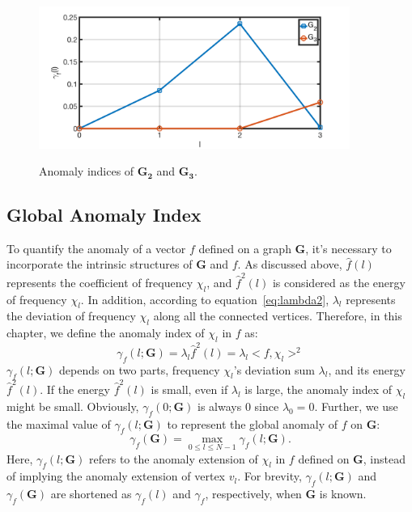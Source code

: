 \begin{figure}[t]
	\centering
    {
		\includegraphics[width= 4in] {figures/new_graph.png}
		\label{fig:distribution2}
	}
	\caption{Anomaly indices of $\mathbf{G_2}$ and $\mathbf{G_3}$.}
	\label{fig:new_graph}
\end{figure}

\subsection{Global Anomaly Index}
\label{sec:signal_anomaly_on_Graph}

To quantify the anomaly of a vector $f$ defined on a graph $\mathbf{G}$, it's necessary to incorporate the intrinsic structures of $\mathbf{G}$ and $f$. As discussed above, $\hat{f}(l)$ represents the coefficient of frequency $\chi_l$, and $\hat{f}^2(l)$ is considered as the energy of frequency $\chi_l$. In addition, according to equation~\ref{eq:lambda2}, $\lambda_l$ represents the deviation of frequency $\chi_l$ along all the connected vertices. Therefore, in this chapter, we define the anomaly index of $\chi_l$ in $f$ as:
\begin{equation}
\label{eq:lambda3}
\gamma_f(l;\mathbf{G})=\lambda_l\hat{f}^2(l)= \lambda_l<f,\chi_l>^2
\end{equation}
$\gamma_f(l;\mathbf{G})$ depends on two parts, frequency $\chi_l$'s deviation sum $\lambda_l$, and its energy $\hat{f}^2(l)$. If the energy $\hat{f}^2(l)$ is small, even if $\lambda_l$ is large, the anomaly index of $\chi_l$ might be small. Obviously, $\gamma_f(0;\mathbf{G})$ is always $0$ since $\lambda_0=0$. Further, we use the maximal value of $\gamma_f(l;\mathbf{G})$ to represent the global anomaly of $f$ on $\mathbf{G}$:
\begin{equation}
\label{eq:lambda4}
\gamma_f(\mathbf{G})=\underset{0 \leq l \leq N-1}{\max}{\gamma_f(l;\mathbf{G})}.
\end{equation}
Here, $\gamma_f(l;\mathbf{G})$ refers to the anomaly extension of $\chi_l$ in $f$ defined on $\mathbf{G}$, instead of implying the anomaly extension of vertex $v_l$.
For brevity, $\gamma_f(l;\mathbf{G})$  and $\gamma_f(\mathbf{G})$ are shortened as $\gamma_f(l)$ and $\gamma_f$, respectively, when $\mathbf{G}$ is known.

